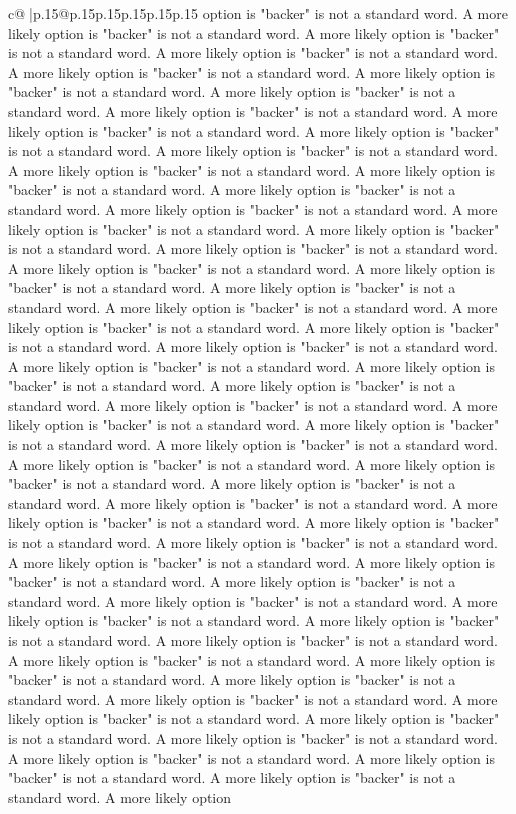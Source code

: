 \documentclass{article}
\begin{document}
{\begin{supertabular}{c@{$\;$}|p{.15\linewidth}@{}p{.15\linewidth}p{.15\linewidth}p{.15\linewidth}p{.15\linewidth}p{.15\linewidth}}
{{{option is "backer" is not a standard word. A more likely option is "backer" is not a standard word. A more likely option is "backer" is not a standard word. A more likely option is "backer" is not a standard word. A more likely option is "backer" is not a standard word. A more likely option is "backer" is not a standard word. A more likely option is "backer" is not a standard word. A more likely option is "backer" is not a standard word. A more likely option is "backer" is not a standard word. A more likely option is "backer" is not a standard word. A more likely option is "backer" is not a standard word. A more likely option is "backer" is not a standard word. A more likely option is "backer" is not a standard word. A more likely option is "backer" is not a standard word. A more likely option is "backer" is not a standard word. A more likely option is "backer" is not a standard word. A more likely option is "backer" is not a standard word. A more likely option is "backer" is not a standard word. A more likely option is "backer" is not a standard word. A more likely option is "backer" is not a standard word. A more likely option is "backer" is not a standard word. A more likely option is "backer" is not a standard word. A more likely option is "backer" is not a standard word. A more likely option is "backer" is not a standard word. A more likely option is "backer" is not a standard word. A more likely option is "backer" is not a standard word. A more likely option is "backer" is not a standard word. A more likely option is "backer" is not a standard word. A more likely option is "backer" is not a standard word. A more likely option is "backer" is not a standard word. A more likely option is "backer" is not a standard word. A more likely option is "backer" is not a standard word. A more likely option is "backer" is not a standard word. A more likely option is "backer" is not a standard word. A more likely option is "backer" is not a standard word. A more likely option is "backer" is not a standard word. A more likely option is "backer" is not a standard word. A more likely option is "backer" is not a standard word. A more likely option is "backer" is not a standard word. A more likely option is "backer" is not a standard word. A more likely option is "backer" is not a standard word. A more likely option is "backer" is not a standard word. A more likely option is "backer" is not a standard word. A more likely option is "backer" is not a standard word. A more likely option is "backer" is not a standard word. A more likely option is "backer" is not a standard word. A more likely option is "backer" is not a standard word. A more likely option is "backer" is not a standard word. A more likely option is "backer" is not a standard word. A more likely option is "backer" is not a standard word. A more likely option is "backer" is not a standard word. A more likely option is "backer" is not a standard word. A more likely option is "backer" is not a standard word. A more likely option is "backer" is not a standard word. A more likely option is "backer" is not a standard word. A more likely option is "backer" is not a standard word. A more likely option }}}
\end{supertabular}}
\end{document}
